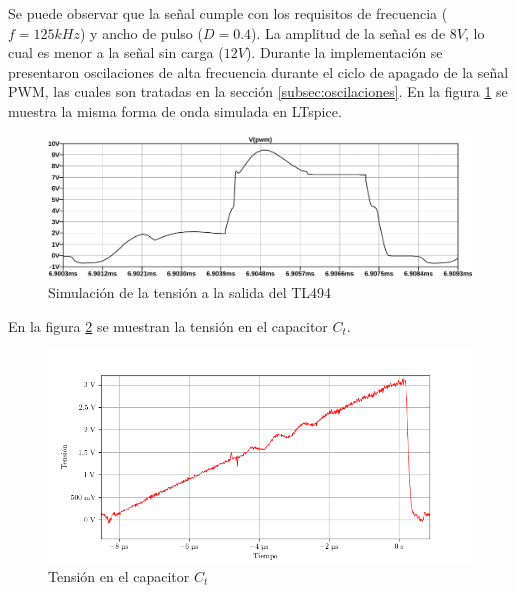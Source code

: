Se puede observar que la señal cumple con los requisitos de frecuencia ($f=125kHz$) y ancho de pulso ($D=0.4$).
La amplitud de la señal es de $8V$, lo cual es menor a la señal sin carga ($12V$).
Durante la implementación se presentaron oscilaciones de alta frecuencia durante el ciclo de apagado de la señal PWM, las cuales son tratadas en la sección \ref{subsec:oscilaciones}.
En la figura \ref{fig:sim:osc_pwm_vout} se muestra la misma forma de onda simulada en LTspice.

\begin{figure}[H]
    \centering
    \includegraphics[width=\textwidth]{images/sim/3.pdf}
    \caption{Simulación de la tensión a la salida del TL494}
    \label{fig:sim:osc_pwm_vout}
\end{figure}

En la figura \ref{fig:ct_v} se muestran la tensión en el capacitor $C_t$.

\begin{figure}[H]
    \centering
    \includegraphics[width=\textwidth]{images/capturas-osciloscopio/17-11-2022/5.png}
    \caption{Tensión en el capacitor $C_t$} %
    \label{fig:ct_v}
\end{figure}

